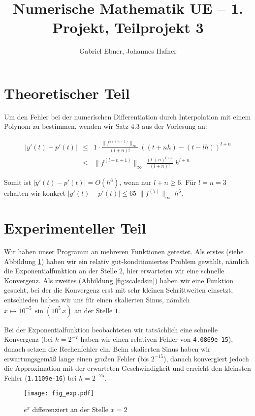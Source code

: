 \documentclass{scrartcl}
\begin{document}
\title{Numerische Mathematik UE -- 1. Projekt, Teilprojekt 3}
\author{Gabriel Ebner, Johannes Hafner}
\maketitle

\section{Theoretischer Teil}

Um den Fehler bei der numerischen Differentiation durch Interpolation mit einem
Polynom zu bestimmen, wenden wir Satz 4.3 aus der Vorlesung an:

\begin{eqnarray*}
|y'(t) - p'(t)| &\leq& 1 \cdot
    \frac{\|f^{(l+n+1)}\|_\infty}{(l+n)!}\; ((t+nh) - (t-lh))^{l+n} \\
  &\leq& \|f^{(l+n+1)}\|_\infty\; \frac{(l+n)^{l+n}}{(l+n)!}\; h^{l+n}
\end{eqnarray*}

Somit ist \(|y'(t)-p'(t)| = O(h^6)\), wenn nur \(l+n \geq 6\).  Für \(l=n=3\)
erhalten wir konkret \(|y'(t)-p'(t)| \leq 65\; \|f^{(7)}\|_\infty\; h^6\).

\section{Experimenteller Teil}

Wir haben unser Programm an mehreren Funktionen getestet.  Als erstes (siehe
Abbildung \ref{fig:exp}) haben wir ein relativ gut-konditioniertes Problem gewählt,
nämlich die Exponentialfunktion an der Stelle \(2\), hier erwarteten wir eine
schnelle Konvergenz.  Als zweites (Abbildung \ref{fig:scaledsin}) haben wir eine Funktion
gesucht, bei der die Konvergenz erst mit sehr kleinen Schrittweiten einsetzt,
entschieden haben wir uns für einen skalierten Sinus, nämlich \(x \mapsto
10^{-5}\, \sin(10^5\, x)\) an der Stelle \(1\).

Bei der Exponentialfunktion beobachteten wir tatsächlich eine schnelle
Konvergenz (bei \(h=2^{-7}\) haben wir einen relativen Fehler von
\verb|4.0869e-15|), danach setzen die Rechenfehler ein.  Beim skalierten Sinus
haben wir erwartungsgemäß lange einen großen Fehler (bis \(2^{-15}\)), danach
konvergiert jedoch die Approximation mit der erwarteten Geschwindig\-keit und
erreicht den kleinsten Fehler (\verb|1.1109e-16|) bei \(h=2^{-25}\).

\begin{figure}[!htb]
\centering
\texttt{[image: fig\_exp.pdf]}
\caption{\(e^x\) differenziert an der Stelle \(x=2\)}
\label{fig:exp}
\end{figure}
\end{document}
